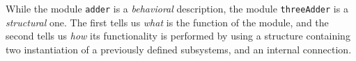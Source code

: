 While the module {\tt adder} is a {\em behavioral} description,
the module {\tt threeAdder} is a {\em structural} one. The first
tells us {\em what} is the function of the module, and the second
tells us {\em how} its functionality is performed by using a
structure containing two instantiation of a previously defined
subsystems, and an internal connection.